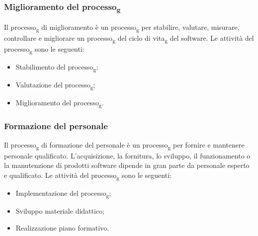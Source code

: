 \subsubsection{Miglioramento del processo\textsubscript{g}}
Il processo\textsubscript{g} di miglioramento è un processo\textsubscript{g} per stabilire, valutare, misurare, controllare e migliorare un processo\textsubscript{g} del ciclo di vita\textsubscript{g} del software.
Le attività del processo\textsubscript{g} sono le seguenti:
\begin{itemize}
\item Stabilimento del processo\textsubscript{g};
\item Valutazione del processo\textsubscript{g};
\item Miglioramento del processo\textsubscript{g}.
\end{itemize}

\subsubsection{Formazione del personale}
Il processo\textsubscript{g} di formazione del personale è un processo\textsubscript{g} per fornire e mantenere personale qualificato. L'acquisizione, la fornitura, lo sviluppo, il funzionamento o la manutenzione di prodotti software dipende in gran parte da personale esperto e qualificato.
Le attività del processo\textsubscript{g} sono le seguenti:
\begin{itemize}
\item Implementazione del processo\textsubscript{g};
\item Sviluppo materiale didattico;
\item Realizzazione piano formativo.
\end{itemize}